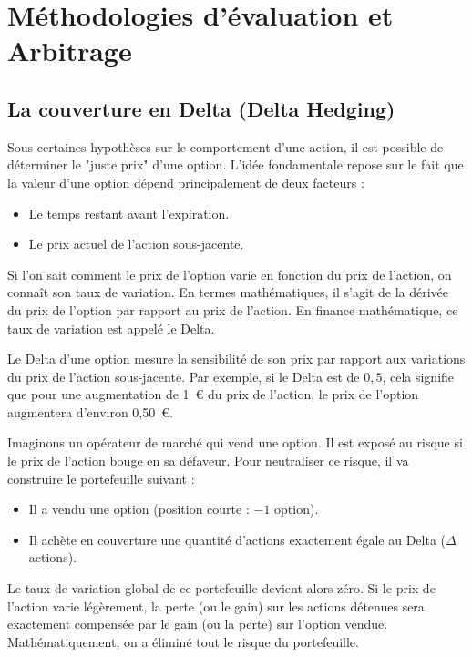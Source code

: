 \section{Méthodologies d'évaluation et Arbitrage}

\subsection{La couverture en Delta (Delta Hedging)}

\begin{intuitionbox}
Sous certaines hypothèses sur le comportement d'une action, il est possible de déterminer le "juste prix" d'une option. L'idée fondamentale repose sur le fait que la valeur d'une option dépend principalement de deux facteurs :
\begin{itemize}[label=$\rightarrow$]
    \item Le temps restant avant l'expiration.
    \item Le prix actuel de l'action sous-jacente.
\end{itemize}
Si l'on sait comment le prix de l'option varie en fonction du prix de l'action, on connaît son taux de variation. En termes mathématiques, il s'agit de la dérivée du prix de l'option par rapport au prix de l'action. En finance mathématique, ce taux de variation est appelé le Delta.
\end{intuitionbox}

\begin{definitionbox}
Le Delta d'une option mesure la sensibilité de son prix par rapport aux variations du prix de l'action sous-jacente. 
Par exemple, si le Delta est de $0,5$, cela signifie que pour une augmentation de 1~€ du prix de l'action, le prix de l'option augmentera d'environ 0,50~€.
\end{definitionbox}

\begin{examplebox}
Imaginons un opérateur de marché qui vend une option. Il est exposé au risque si le prix de l'action bouge en sa défaveur. Pour neutraliser ce risque, il va construire le portefeuille suivant :
\begin{itemize}[label=$\rightarrow$]
    \item Il a vendu une option (position courte : $-1$ option).
    \item Il achète en couverture une quantité d'actions exactement égale au Delta ($\Delta$ actions).
\end{itemize}
Le taux de variation global de ce portefeuille devient alors zéro. Si le prix de l'action varie légèrement, la perte (ou le gain) sur les actions détenues sera exactement compensée par le gain (ou la perte) sur l'option vendue. Mathématiquement, on a éliminé tout le risque du portefeuille.
\end{examplebox}

